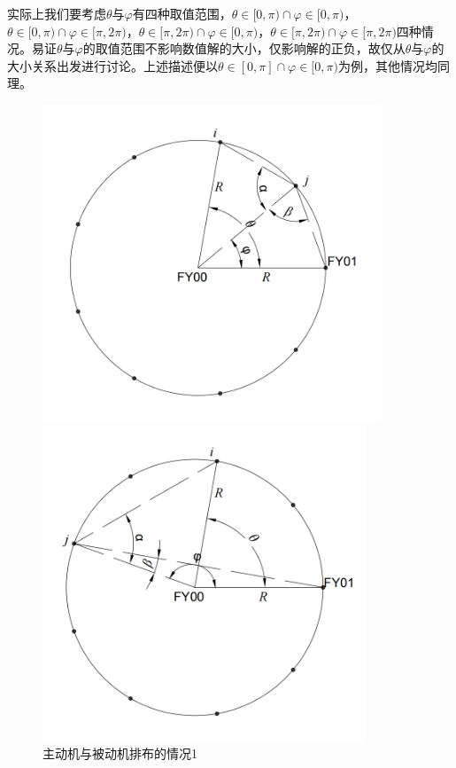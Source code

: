 \documentclass[withoutpreface,bwprint]{cumcmthesis} %
\begin{document}
实际上我们要考虑$\theta$与$\varphi$有四种取值范围，$\theta \in[0,\pi)\cap \varphi \in[0,\pi)$，$\theta \in[0,\pi)\cap \varphi \in[\pi,2\pi)$，$\theta \in[\pi,2\pi)\cap \varphi \in[0,\pi)$，$\theta \in[\pi,2\pi)\cap \varphi \in[\pi,2\pi)$四种情况。易证$\theta$与$\varphi$的取值范围不影响数值解的大小，仅影响解的正负，故仅从$\theta$与$\varphi$的大小关系出发进行讨论。上述描述便以$\theta \in[0,\pi]\cap \varphi \in[0,\pi)$为例，其他情况均同理。


\begin{figure}[H]
    \centering
    \begin{minipage}{0.49\textwidth}
        \centering
        \includegraphics[width=0.9\textwidth]{../../figure/q1_1.png} 
        \caption{主动机与被动机排布的情况1}
        \label{q1_1}
    \end{minipage}
    \begin{minipage}{0.49\textwidth}
        \centering
        \includegraphics[width=0.86\textwidth]{../../figure/q1_2.png} 

\end{minipage}
\end{figure}
\end{document}
